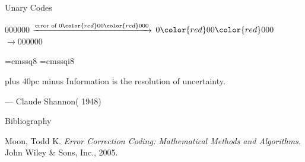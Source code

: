 \documentclass[aspectratio=169]{beamer}
\begin{document}
\begin{frame}{Unary Codes}
    \begin{center}
        \pause
        $000000$
        \pause
        $\xrightarrow{\text{error of }0{\color{red}0}0{\color{red}00}0}$
        \pause
        $0{\color{red}0}0{\color{red}00}0$
        \pause 
        $\rightarrow 000000$
    \end{center}
\end{frame}

\font\eightss=cmssq8
\font\eightssi=cmssqi8
\newcommand\quoteAuthorDate[3]{\begingroup
  \baselineskip 10pt
  \parfillskip 0pt
  \interlinepenalty 10000 %
  \leftskip 0pt plus 40pc minus \parindent
  \let\rm=\eightss
  \let\sl=\eightssi
  \everypar{\sl}#1\par
  \nobreak\smallskip
  \noindent\rm--- #2\unskip\enspace(#3)\par
  \endgroup}
\begin{frame}
    \begin{center}
        \item \quoteAuthorDate{Information is the resolution of uncertainty.}{Claude Shannon}{\color{sigma@mainblue} 1948}
    \end{center}
\end{frame}

\begin{frame}{Bibliography}
    
    
    Moon, Todd K. \textit{Error Correction Coding: Mathematical Methods and Algorithms.} John Wiley \& Sons, Inc., 2005. 
\end{frame}
\end{document}

